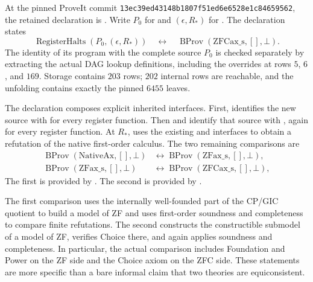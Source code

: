 At the pinned ProveIt commit
\texttt{13ec39ed43148b1807f51ed6e6528e1c84659562}, the retained declaration
is .
Write $P_0$ for  and $(\epsilon,R_*)$
for . The declaration states
\[
 \operatorname{RegisterHalts}(P_0,(\epsilon,R_*))
 \quad\longleftrightarrow\quad
 \operatorname{BProv}(\mathrm{ZFCax\_s},[],\bot).
\]
The identity of its program with the complete source $P_0$ is
checked separately by extracting the actual DAG lookup definitions,
including the overrides at rows $5$, $6$, and $169$.  Storage
contains $203$ rows; $202$ internal rows are reachable, and the
unfolding contains exactly the pinned $6455$ leaves.

The declaration composes explicit inherited interfaces.  First,
 identifies the new
source with  for every register
function.  Then 
and  identify that
source with , again for every register
function.  At $R_*$,
 uses the
existing  and
interfaces to obtain a refutation of the native first-order
calculus.  The two remaining comparisons are
\begin{align*}
 \operatorname{BProv}(\mathrm{NativeAx},[],\bot)
  &\longleftrightarrow
   \operatorname{BProv}(\mathrm{ZFax\_s},[],\bot),\\
 \operatorname{BProv}(\mathrm{ZFax\_s},[],\bot)
  &\longleftrightarrow
   \operatorname{BProv}(\mathrm{ZFCax\_s},[],\bot),
\end{align*}
The first is provided by .
The second is provided by
.

The first comparison uses the internally well-founded part of the
CP/GIC quotient to build a model of ZF and uses first-order soundness
and completeness to compare finite refutations.  The second
constructs the constructible submodel of a model of ZF, verifies
Choice there, and again applies soundness and completeness.  In
particular, the actual comparison includes Foundation and Power
on the ZF side and the Choice axiom on the ZFC side.  These
statements are more specific than a bare informal claim that two
theories are equiconsistent.

